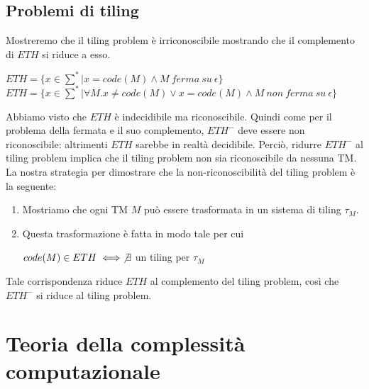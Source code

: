 \documentclass[a4paper, 12pt]{article}
\begin{document}
\subsection{Problemi di tiling}
Mostreremo che il tiling problem \`e irriconoscibile mostrando che il complemento di $ETH$ si riduce a esso.
\begin{center}
$ETH = \{x \in \sum^{*} | x = code(M) \land M\ ferma\ su\ \epsilon\}$\\
$ETH = \{x \in \sum^{*} | \forall M.x \neq code(M) \lor x = code(M) \land M\ non\ ferma\ su\ \epsilon\}$
\end{center}
Abbiamo visto che $ETH$ \`e indecidibile ma riconoscibile. Quindi come per il problema della fermata e il suo complemento, $ETH^{-}$ deve essere non riconoscibile: altrimenti $ETH$ sarebbe in realt\`a decidibile. Perci\`o, ridurre $ETH^{-}$ al tiling problem implica che il tiling problem non sia riconoscibile da nessuna TM.
La nostra strategia per dimostrare che la non-riconoscibilit\`a  del tiling problem \`e la seguente:
\begin{enumerate}
\item Mostriamo che ogni TM $M$ pu\`o essere trasformata in un sistema di tiling $\tau_{M}$.
\item Questa trasformazione \`e fatta in modo tale per cui \begin{center}
$code(M) \in ETH \iff \not\exists$ un tiling per $\tau_{M}$
\end{center}
\end{enumerate}
Tale corrispondenza riduce $ETH$ al complemento del tiling problem, cos\`i che $ETH^{-}$ si riduce al tiling problem.
\newpage
\section{Teoria della complessit\`a computazionale}
\end{document}
